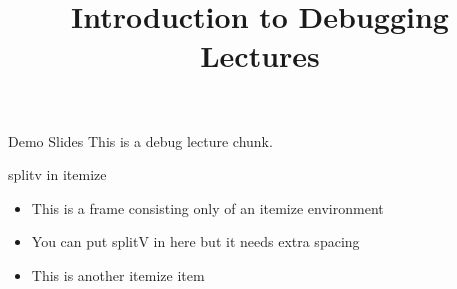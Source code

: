 \documentclass[11pt,compress,t,notes=noshow, xcolor=table]{beamer}
\title{Introduction to Debugging Lectures}
\begin{document}

\begin{frame}{Demo Slides}
  \vfill
  This is a debug lecture chunk.
  \vfill
\end{frame}


\begin{frame}{splitv in itemize}
  \begin{itemize}
  \item This is a frame consisting only of an itemize environment
  \item You can put splitV in here but it needs extra spacing
  \vfill
  \vfill
  \item This is another itemize item
  \end{itemize}
\end{frame}

\endlecture
\end{document}
